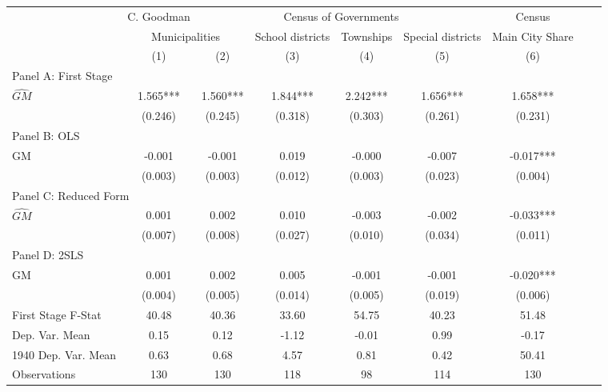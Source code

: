  \begin{tabular}{l*{8}{c}} \toprule
&\multicolumn{1}{c}{C. Goodman}&\multicolumn{4}{c}{Census of Governments}&\multicolumn{1}{c}{Census}\\\cmidrule(lr){2-2}\cmidrule(lr){3-6}\cmidrule(lr){7-7}
&\multicolumn{2}{c}{Municipalities}&\multicolumn{1}{c}{School districts}&\multicolumn{1}{c}{Townships}&\multicolumn{1}{c}{Special districts}&\multicolumn{1}{c}{Main City Share}\\\cmidrule(lr){2-3}\cmidrule(lr){4-6}\cmidrule(lr){7-7}
&\multicolumn{1}{c}{(1)}&\multicolumn{1}{c}{(2)}&\multicolumn{1}{c}{(3)}&\multicolumn{1}{c}{(4)}&\multicolumn{1}{c}{(5)}&\multicolumn{1}{c}{(6)}\\
\cmidrule(lr){1-7}
\multicolumn{6}{l}{Panel A: First Stage}\\
\cmidrule(lr){1-7}
$\widehat{GM}$  &    1.565***&    1.560***&    1.844***&    2.242***&    1.656***&    1.658***\\
                &  (0.246)   &  (0.245)   &  (0.318)   &  (0.303)   &  (0.261)   &  (0.231)   \\
\cmidrule(lr){1-7}
\multicolumn{6}{l}{Panel B: OLS}\\
\cmidrule(lr){1-7}
GM              &   -0.001   &   -0.001   &    0.019   &   -0.000   &   -0.007   &   -0.017***\\
                &  (0.003)   &  (0.003)   &  (0.012)   &  (0.003)   &  (0.023)   &  (0.004)   \\
\cmidrule(lr){1-7}
\multicolumn{6}{l}{Panel C: Reduced Form}\\
\cmidrule(lr){1-7}
$\widehat{GM}$  &    0.001   &    0.002   &    0.010   &   -0.003   &   -0.002   &   -0.033***\\
                &  (0.007)   &  (0.008)   &  (0.027)   &  (0.010)   &  (0.034)   &  (0.011)   \\
\cmidrule(lr){1-7}
\multicolumn{6}{l}{Panel D: 2SLS}\\
\cmidrule(lr){1-7}
GM              &    0.001   &    0.002   &    0.005   &   -0.001   &   -0.001   &   -0.020***\\
                &  (0.004)   &  (0.005)   &  (0.014)   &  (0.005)   &  (0.019)   &  (0.006)   \\
\midrule
First Stage F-Stat&    40.48   &    40.36   &    33.60   &    54.75   &    40.23   &    51.48   \\
Dep. Var. Mean  &     0.15   &     0.12   &    -1.12   &    -0.01   &     0.99   &    -0.17   \\
1940 Dep. Var. Mean&     0.63   &     0.68   &     4.57   &     0.81   &     0.42   &    50.41   \\
Observations    &      130   &      130   &      118   &       98   &      114   &      130   \\
       \bottomrule \end{tabular}
